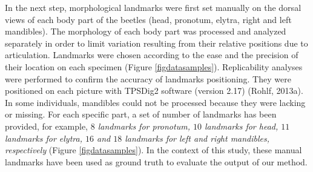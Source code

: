 \documentclass[review]{elsarticle}
\begin{document}
In the next step, morphological landmarks were first set manually on
the dorsal views of each body part of the beetles (head, pronotum,
elytra, right and left mandibles). The morphology of each body part
was processed and analyzed separately in order to limit variation
resulting from their relative positions due to articulation. Landmarks
were chosen according to the ease and the precision of their location
on each specimen (Figure \ref{figdatasamples}). Replicability analyses
were performed to confirm the accuracy of landmarks positioning. They
were positioned on each picture with TPSDig2 software (version 2.17)
(Rohlf, 2013a). In some individuals, mandibles could not be processed
because they were lacking or missing. For each specific part, a set of
number of landmarks has been provided, for example, \textit{$8$
  landmarks for pronotum, $10$ landmarks for head, $11$ landmarks for
  elytra, $16$ and $18$ landmarks for left and right mandibles,
  respectively} (Figure \ref{figdatasamples}). In the context of this
study, these manual landmarks have been used as ground truth to
evaluate the output of our method.
\end{document}
